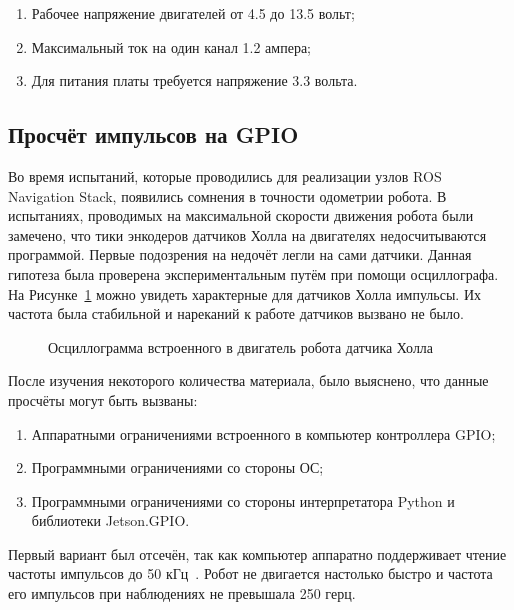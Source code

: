 \begin{enumerate}[beginpenalty=10000] %
  \item Рабочее напряжение двигателей от 4.5 до 13.5 вольт;
  \item Максимальный ток на один канал 1.2 ампера;
  \item Для питания платы требуется напряжение 3.3 вольта.
\end{enumerate}

\subsection{Просчёт импульсов на GPIO}
Во время испытаний, которые проводились для реализации узлов ROS Navigation Stack, появились сомнения в точности одометрии робота. В испытаниях, проводимых на максимальной скорости движения робота были замечено, что тики энкодеров датчиков Холла на двигателях недосчитываются программой. Первые подозрения на недочёт легли на сами датчики. Данная гипотеза была проверена экспериментальным путём при помощи осциллографа. На Рисунке~\cref{fig:hole-signal} можно увидеть характерные для датчиков Холла импульсы. Их частота была стабильной и нареканий к работе датчиков вызвано не было.

\begin{figure}[ht]
    \caption{Осциллограмма встроенного в двигатель робота датчика Холла}\label{fig:hole-signal}
\end{figure}
 
После изучения некоторого количества материала, было выяснено, что данные просчёты могут быть вызваны:

\begin{enumerate}[beginpenalty=10000] %
  \item Аппаратными ограничениями встроенного в компьютер контроллера GPIO;
  \item Программными ограничениями со стороны ОС;
  \item Программными ограничениями со стороны интерпретатора Python и библиотеки Jetson.GPIO.
\end{enumerate}

Первый вариант был отсечён, так как компьютер аппаратно поддерживает чтение частоты импульсов до 50 кГц~\cite{gpio-limits}. Робот не двигается настолько быстро и частота его импульсов при наблюдениях не превышала 250 герц.

